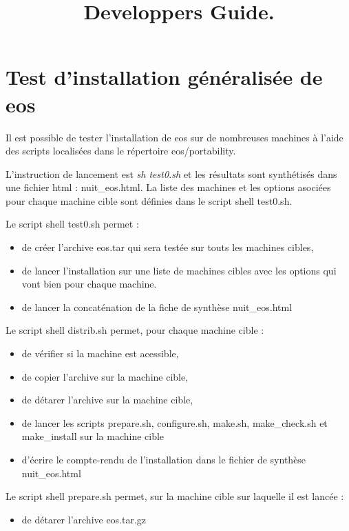 \documentclass[12pt]{article}
\title{Developpers Guide.}
\begin{document}
\maketitle
\newpage
\tableofcontents
\newpage
\section{Test d'installation généralisée de eos}

Il est possible de tester l'installation de eos sur de nombreuses
machines à l'aide des scripts localisées dans le répertoire
eos/portability.

L'instruction de lancement est {\it sh test0.sh} et les résultats sont
synthétisés dans une fichier html : nuit\_eos.html. La liste des
machines et les options asociées pour chaque machine cible sont
définies dans le script shell test0.sh.

Le script shell test0.sh permet :
\begin{itemize}
 \item de créer l'archive eos.tar qui sera testée sur touts les machines cibles,
 \item de lancer l'installation sur une liste de machines cibles avec
   les options qui vont bien pour chaque machine.  
 \item de lancer la concaténation de la fiche de synthèse nuit\_eos.html
\end{itemize}

Le script shell distrib.sh permet, pour chaque machine cible :
\begin{itemize}
 \item de vérifier si la machine est acessible,
 \item de copier l'archive sur la machine cible,
 \item de détarer l'archive sur la machine cible,
 \item de lancer les scripts prepare.sh, configure.sh, make.sh,
   make\_check.sh et make\_install sur la machine cible
 \item d'écrire le compte-rendu de l'installation dans le fichier de synthèse nuit\_eos.html
\end{itemize}

Le script shell prepare.sh permet, sur la machine cible sur laquelle il
est lancée :
\begin{itemize}
 \item de détarer l'archive eos.tar.gz
\end{itemize}
\end{document}

